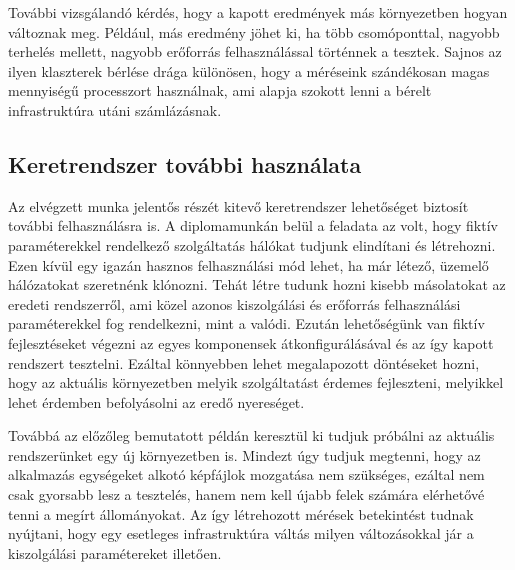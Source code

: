 További vizsgálandó kérdés, hogy a kapott eredmények más környezetben hogyan változnak meg.
Például, más eredmény jöhet ki, ha több csomóponttal, nagyobb terhelés mellett, nagyobb erőforrás felhasználással történnek a tesztek.
Sajnos az ilyen klaszterek bérlése drága különösen, hogy a méréseink szándékosan magas mennyiségű processzort használnak, ami alapja szokott lenni a bérelt infrastruktúra utáni számlázásnak.


\subsection{Keretrendszer további használata}
Az elvégzett munka jelentős részét kitevő keretrendszer lehetőséget biztosít további felhasználásra is.
A diplomamunkán belül a feladata az volt, hogy fiktív paraméterekkel rendelkező szolgáltatás hálókat tudjunk elindítani és létrehozni.
Ezen kívül egy igazán hasznos felhasználási mód lehet, ha már létező, üzemelő hálózatokat szeretnénk klónozni.
Tehát létre tudunk hozni kisebb másolatokat az eredeti rendszerről, ami közel azonos kiszolgálási és erőforrás felhasználási paraméterekkel fog rendelkezni, mint a valódi.
Ezután lehetőségünk van fiktív fejlesztéseket végezni az egyes komponensek átkonfigurálásával és az így kapott rendszert tesztelni.
Ezáltal könnyebben lehet megalapozott döntéseket hozni, hogy az aktuális környezetben melyik szolgáltatást érdemes fejleszteni, melyikkel lehet érdemben befolyásolni az eredő nyereséget.

Továbbá az előzőleg bemutatott példán keresztül ki tudjuk próbálni az aktuális rendszerünket egy új környezetben is.
Mindezt úgy tudjuk megtenni, hogy az alkalmazás egységeket alkotó képfájlok mozgatása nem szükséges, ezáltal nem csak gyorsabb lesz a tesztelés, hanem nem kell újabb felek számára elérhetővé tenni a megírt állományokat.
Az így létrehozott mérések betekintést tudnak nyújtani, hogy egy esetleges infrastruktúra váltás milyen változásokkal jár a kiszolgálási paramétereket illetően.